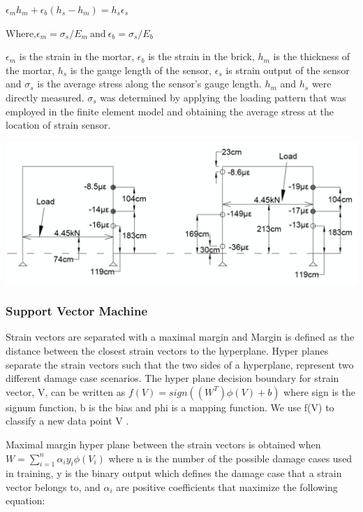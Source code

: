 \documentclass{article}
\begin{document}
\begin{center}
    $ \epsilon_{m}h_{m}+ \epsilon_{b}(h_{s}-h_{m}) = h_{s}\epsilon_{s}$

    $\text{Where,} \epsilon_{m}=\sigma_{s}/E_{m} \ \text{and} \ \epsilon_{b}=\sigma_{s}/E_{b}$
\end{center}

\justifying
$\epsilon_{m}$ is the strain in the mortar, $\epsilon_{b}$ is the strain in the brick, $h_{m}$ is the thickness of the mortar, $h_{s}$ is the gauge length of the sensor, $\epsilon_{s}$ is strain output of the sensor and $ \sigma_{s}$ is the average stress along the sensor’s gauge length. $h_{m}$ and $h_{s}$ were directly measured. $\sigma_{s}$ was determined by applying the loading pattern that was employed in the finite element model and obtaining the average stress at the location of strain sensor.

\begin{center}
    \includegraphics[scale=0.25]{Images/Structural_loading.png}

\end{center}

\subsubsection{Support Vector Machine}
Strain vectors are separated with a maximal margin and Margin is defined as the distance between the closest strain vectors to the hyperplane. Hyper planes separate the strain vectors such that the two sides of a hyperplane, represent two different damage case scenarios.
The hyper plane decision boundary for strain vector, V, can be written as $f(V) = sign((W^T)\phi(V) + b)$ where sign is the signum function, b is the bias and phi is a mapping function. We use f(V) to classify a new data point V .

Maximal margin hyper  plane between the strain vectors is obtained when $W = \sum^n_{i=1} \alpha_{i}y_{i} \phi(V_{i})$ where n is the number of the possible damage cases used in training, y is the binary output which defines the damage case that a strain vector belongs to, and $\alpha_{i}$ are positive coefficients that maximize the following equation:
\end{document}
